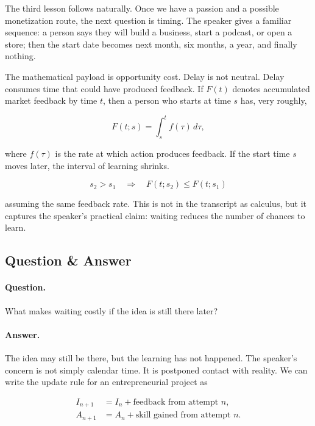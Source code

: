 The third lesson follows naturally. Once we have a passion and a possible monetization route, the next question is timing. The speaker gives a familiar sequence: a person says they will build a business, start a podcast, or open a store; then the start date becomes next month, six months, a year, and finally nothing.

The mathematical payload is opportunity cost. Delay is not neutral. Delay consumes time that could have produced feedback. If \(F(t)\) denotes accumulated market feedback by time \(t\), then a person who starts at time \(s\) has, very roughly,

\begin{equation}
F(t;s)=\int_s^t f(\tau)\,d\tau,
\end{equation}

where \(f(\tau)\) is the rate at which action produces feedback. If the start time \(s\) moves later, the interval of learning shrinks.

\begin{equation}
s_2>s_1
\quad\Longrightarrow\quad
F(t;s_2)\leq F(t;s_1)
\end{equation}

assuming the same feedback rate. This is not in the transcript as calculus, but it captures the speaker's practical claim: waiting reduces the number of chances to learn.

\subsection{Question \& Answer}

\paragraph{Question.}
What makes waiting costly if the idea is still there later?

\paragraph{Answer.}
The idea may still be there, but the learning has not happened. The speaker's concern is not simply calendar time. It is postponed contact with reality. We can write the update rule for an entrepreneurial project as

\begin{align}
I_{n+1} &= I_n + \text{feedback from attempt } n,\\
A_{n+1} &= A_n + \text{skill gained from attempt } n.
\end{align}

